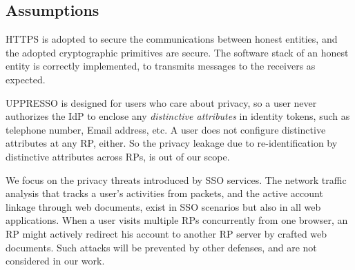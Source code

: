 
\subsection{Assumptions}
HTTPS is adopted to secure the communications between honest entities,
 and the adopted cryptographic primitives are secure.
The software stack of an honest entity is correctly implemented,
     to transmits messages to the receivers as expected.

UPPRESSO is designed for users who care about privacy,
so a user never authorizes the IdP to enclose any \emph{distinctive attributes} in identity tokens,
 such as telephone number, Email address, etc.
A user does not configure  distinctive attributes at any RP, either.
So the privacy leakage due to re-identification by distinctive attributes across RPs,
    is out of our scope.

We focus on the privacy threats introduced by SSO services.
The network traffic analysis that tracks a user's activities from packets,
    and the active account linkage through web documents,
        exist in SSO scenarios but also in all web applications.
When a user visits multiple RPs concurrently from one browser,
        an RP might actively redirect his account to another RP server by crafted web documents.
Such attacks will be prevented by other defenses,
    and are not considered in our work.




